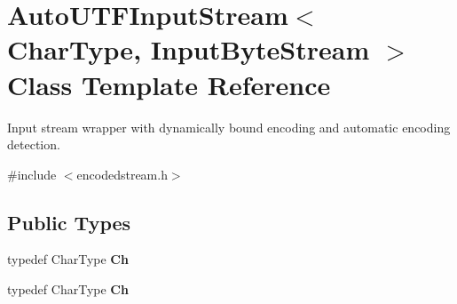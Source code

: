 \hypertarget{classAutoUTFInputStream}{}\section{Auto\+U\+T\+F\+Input\+Stream$<$ Char\+Type, Input\+Byte\+Stream $>$ Class Template Reference}
\label{classAutoUTFInputStream}


Input stream wrapper with dynamically bound encoding and automatic encoding detection.  




{\ttfamily \#include $<$encodedstream.\+h$>$}

\subsection*{Public Types}
\begin{DoxyCompactItemize}
\item 
\mbox{\label{classAutoUTFInputStream_a3bb3eb46f2c20404a7ac21963cfe348f}} 
typedef Char\+Type {\bfseries Ch}
\item 
\mbox{\label{classAutoUTFInputStream_a3bb3eb46f2c20404a7ac21963cfe348f}} 
typedef Char\+Type {\bfseries Ch}
\end{DoxyCompactItemize}
